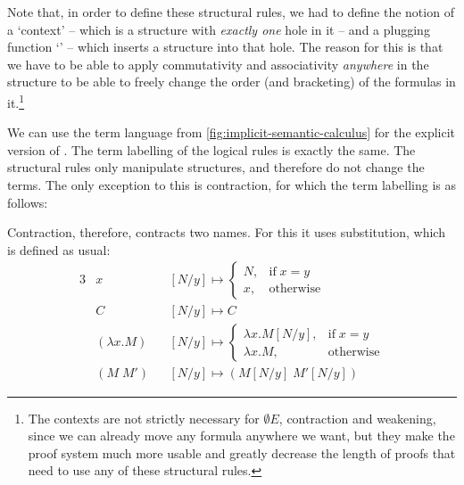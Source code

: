 \documentclass[a4paper]{article}
\begin{document}


Note that, in order to define these structural rules, we had to define
the notion of a `context' --  which is a structure with \emph{exactly
one} hole in it -- and a plugging function `\plug' -- which inserts a
structure into that hole. The reason for this is that we have to be
able to apply commutativity and associativity \emph{anywhere} in the
structure to be able to freely change the order (and bracketing) of
the formulas in it.\footnote{%
  The contexts are not strictly necessary for $\emptyset E$,
  contraction and weakening, since we can already move any formula
  anywhere we want, but they make the proof system much more usable
  and greatly decrease the length of proofs that need to use any of
  these structural rules.
}

We can use the term language from \autoref{fig:implicit-semantic-calculus}
for the explicit version of \lamET. The term labelling of the logical
rules is exactly the same. The structural rules only manipulate
structures, and therefore do not change the terms. The only exception
to this is contraction, for which the term labelling is as follows:
\begin{prooftree}
\end{prooftree}
Contraction, therefore, contracts two names. For this it uses
substitution, which is defined as usual:
\begin{alignat*}{3}
  &x             &&[N/y] \mapsto
  \begin{cases}
    N, &\text{if}\;x=y\\
    x, &\text{otherwise}
  \end{cases}
  \\
  &C             &&[N/y] \mapsto C\\
  &(\lambda x.M) &&[N/y] \mapsto
  \begin{cases}
    \lambda x.M[N/y], &\text{if}\;x=y\\
    \lambda x.M,      &\text{otherwise}
  \end{cases}
  \\
  &(M\;M')       &&[N/y] \mapsto (M[N/y]\;M'[N/y])
\end{alignat*}
\end{document}
